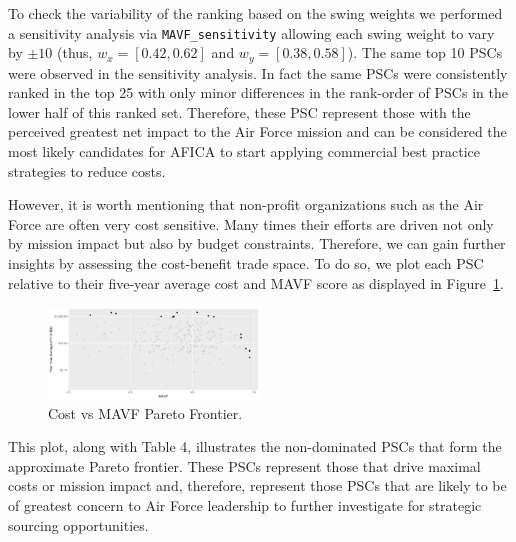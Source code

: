 \documentclass[twocolumn]{svjour3}       %
\begin{document}
To check the variability of the ranking based on the swing weights we performed a sensitivity analysis via \texttt{MAVF\_sensitivity} allowing each swing weight to vary by $\pm 10$ (thus, $w_x = \left[0.42, 0.62\right]$ and $w_y = \left[0.38, 0.58\right]$).  The same top 10 PSCs were observed in the sensitivity analysis.  In fact the same PSCs were consistently ranked in the top 25 with only minor differences in the rank-order of PSCs in the lower half of this ranked set.  Therefore, these PSC represent those with the perceived greatest net impact to the Air Force mission and can be considered the most likely candidates for AFICA to start applying commercial best practice strategies to reduce costs.

However, it is worth mentioning that non-profit organizations such as the Air Force are often very cost sensitive.  Many times their efforts are driven not only by mission impact but also by budget constraints.  Therefore, we can gain further insights by assessing the cost-benefit trade space.   To do so, we plot each PSC relative to their five-year average cost and MAVF score as displayed in Figure~\ref{fig:8}. 

\begin{figure}[!htb]
  \includegraphics[width=0.5\textwidth]{fig8.png}
  \caption{Cost vs MAVF Pareto Frontier.}
  \label{fig:8}
\end{figure}

This plot, along with Table 4, illustrates the non-dominated PSCs that form the approximate Pareto frontier.   These PSCs represent those that drive maximal costs or mission impact and, therefore, represent those PSCs that are likely to be of greatest concern to Air Force leadership to further investigate for strategic sourcing opportunities.
\end{document}
